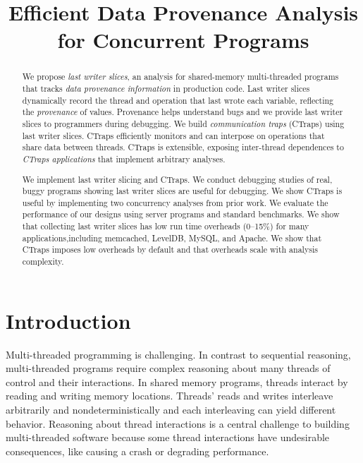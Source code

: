\documentclass[preprint,9pt]{sigplanconf}
\title{Efficient Data Provenance Analysis for Concurrent Programs}
\newcommand{\ctraps}{CTraps\xspace}
\begin{document}
\maketitle

\begin{abstract}
We propose {\em last writer slices}, an analysis for shared-memory
multi-threaded programs that tracks {\em data provenance information} in
production code.  Last writer slices dynamically record the thread and
operation that last wrote each variable, reflecting the {\em provenance} of
values.  Provenance helps understand bugs and we provide last writer slices to
programmers during debugging.  We build {\em communication traps}
(\ctraps) using last writer slices.  \ctraps efficiently
monitors and can interpose on operations that share data between
threads.  \ctraps is extensible, exposing inter-thread dependences
to {\em \ctraps applications} that implement arbitrary analyses.  

We implement last writer slicing and \ctraps.  We conduct debugging studies of
real, buggy programs showing last writer slices are useful for debugging.  We
show \ctraps is useful by implementing two concurrency analyses from prior
work.  We evaluate the performance of our designs using server programs
and standard benchmarks.  We show that collecting last writer slices
has low run time overheads (0--15\%) for many applications,including  
memcached, LevelDB, MySQL, and Apache.  We show that \ctraps imposes low 
overheads by default and that overheads scale with analysis complexity.

\end{abstract}

\section{Introduction}
Multi-threaded programming is challenging.  In contrast to 
sequential reasoning, multi-threaded programs require complex reasoning about
many threads of control and their interactions.  In shared memory programs,
threads interact by reading and writing memory locations.  Threads' reads and
writes interleave arbitrarily and nondeterministically and each interleaving
can yield different behavior.  Reasoning about thread interactions is a central
challenge to building multi-threaded software because some thread interactions
have undesirable consequences, like causing a crash or degrading performance.
\end{document}
